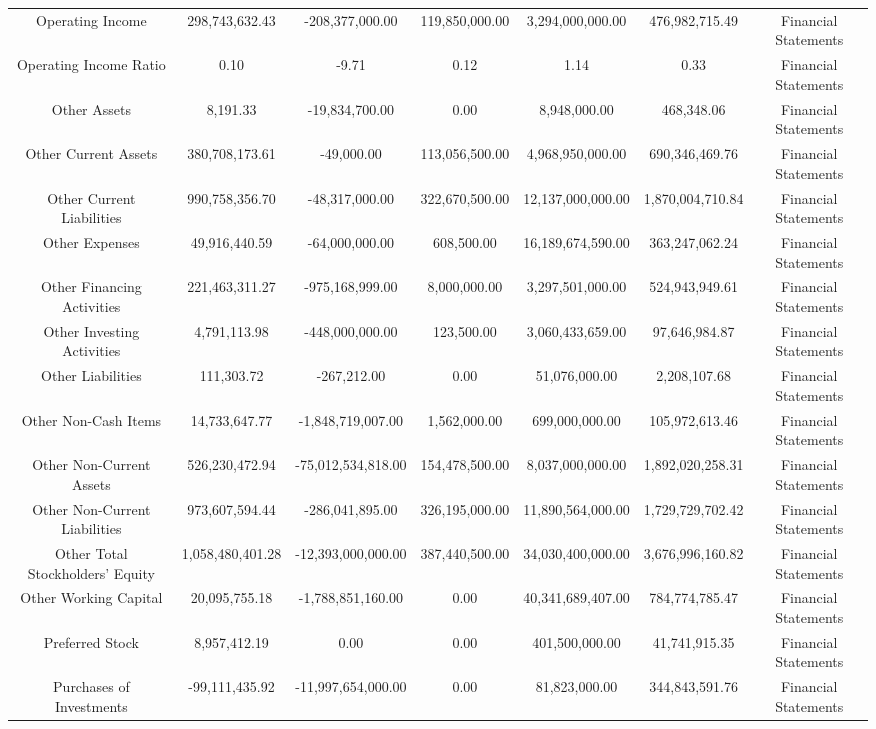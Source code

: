 \begin{longtable}{ccccccc}
Operating Income & 298,743,632.43 & -208,377,000.00 & 119,850,000.00 & 3,294,000,000.00 & 476,982,715.49 & Financial Statements \\
Operating Income Ratio & 0.10 & -9.71 & 0.12 & 1.14 & 0.33 & Financial Statements \\
Other Assets & 8,191.33 & -19,834,700.00 & 0.00 & 8,948,000.00 & 468,348.06 & Financial Statements \\
Other Current Assets & 380,708,173.61 & -49,000.00 & 113,056,500.00 & 4,968,950,000.00 & 690,346,469.76 & Financial Statements \\
Other Current Liabilities & 990,758,356.70 & -48,317,000.00 & 322,670,500.00 & 12,137,000,000.00 & 1,870,004,710.84 & Financial Statements \\
Other Expenses & 49,916,440.59 & -64,000,000.00 & 608,500.00 & 16,189,674,590.00 & 363,247,062.24 & Financial Statements \\
Other Financing Activities & 221,463,311.27 & -975,168,999.00 & 8,000,000.00 & 3,297,501,000.00 & 524,943,949.61 & Financial Statements \\
Other Investing Activities & 4,791,113.98 & -448,000,000.00 & 123,500.00 & 3,060,433,659.00 & 97,646,984.87 & Financial Statements \\
Other Liabilities & 111,303.72 & -267,212.00 & 0.00 & 51,076,000.00 & 2,208,107.68 & Financial Statements \\
Other Non-Cash Items & 14,733,647.77 & -1,848,719,007.00 & 1,562,000.00 & 699,000,000.00 & 105,972,613.46 & Financial Statements \\
Other Non-Current Assets & 526,230,472.94 & -75,012,534,818.00 & 154,478,500.00 & 8,037,000,000.00 & 1,892,020,258.31 & Financial Statements \\
Other Non-Current Liabilities & 973,607,594.44 & -286,041,895.00 & 326,195,000.00 & 11,890,564,000.00 & 1,729,729,702.42 & Financial Statements \\
Other Total Stockholders' Equity & 1,058,480,401.28 & -12,393,000,000.00 & 387,440,500.00 & 34,030,400,000.00 & 3,676,996,160.82 & Financial Statements \\
Other Working Capital & 20,095,755.18 & -1,788,851,160.00 & 0.00 & 40,341,689,407.00 & 784,774,785.47 & Financial Statements \\
Preferred Stock & 8,957,412.19 & 0.00 & 0.00 & 401,500,000.00 & 41,741,915.35 & Financial Statements \\
Purchases of Investments & -99,111,435.92 & -11,997,654,000.00 & 0.00 & 81,823,000.00 & 344,843,591.76 & Financial Statements \\

\end{longtable}
